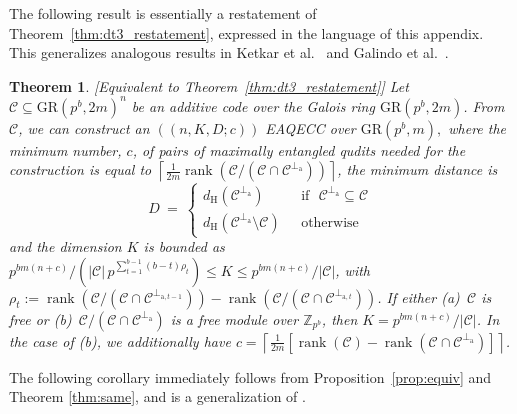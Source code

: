 \documentclass{article}
\DeclareMathOperator{\rank}{rank}
\newtheorem{thm}{Theorem}[section]
\theoremstyle{remark}
\theoremstyle{definition}
\numberwithin{equation}{section}
\begin{document}
The following result is essentially a restatement of Theorem~\ref{thm:dt3_restatement}, expressed in the language of this appendix. This generalizes analogous results in Ketkar et al.\ \cite[Theorem 15]{ketkar} and Galindo et al.\ \cite[Theorem 3]{galindo}.

\begin{thm}\label{thm:dt3_equiv}[Equivalent to Theorem~\ref{thm:dt3_restatement}] Let $\mathcal{C} \subseteq \text{GR}(p^b,2m)^{n}$ be an additive code over the Galois ring $\text{GR}(p^b,2m)$.   From $\mathcal{C}$, we can construct an  $((n,K,D;c))$ EAQECC over $\text{GR}(p^b,m),$ where the minimum number, $c$, of pairs of maximally entangled qudits needed for the construction is equal to  $\left\lceil \frac1{2m}\rank(\mathcal{C}/(\mathcal{C} \cap \mathcal{C}^{\perp_{\mathrm{a}}}))  \right\rceil$, the minimum distance is 
\begin{equation*}
D~=~\left\{\begin{array}{ll}
d_{\mathrm{H}}(\mathcal{C}^{\perp_{\mathrm{a}}}) & \text{~~if~~} \mathcal{C}^{\perp_{\mathrm{a}}} \subseteq \mathcal{C} \\
d_{\mathrm{H}}(\mathcal{C}^{\perp_{\mathrm{a}}}\setminus \mathcal{C} )  & \text{~~otherwise}\,
\end{array}\right.
\end{equation*}
and the dimension $K$ is bounded as $p^{bm(n+c)}/ (|\mathcal{C}| \, {p^{\sum_{t=1}^{b-1} (b-t)\rho_t}}) \leq  K \leq p^{bm(n+c)}/|\mathcal{C}|$, with $\rho_t := \rank(\mathcal{C}/(\mathcal{C} \cap \mathcal{C}^{\perp_{\mathrm{a},t-1}}))-\rank(\mathcal{C}/(\mathcal{C} \cap \mathcal{C}^{\perp_{\mathrm{a},t}}))$.  
If either \emph{(a)}~$\mathcal{C}$ is free or \emph{(b)}~$\mathcal{C}/(\mathcal{C} \cap \mathcal{C}^{\perp_{\mathrm{a}}})$ is a free module over $\mathbb{Z}_{p^b}$, then $K = p^{bm(n+c)}/|\mathcal{C}|$. In the case of \emph{(b)}, we additionally have $c=\left\lceil \frac1{2m}[\rank(\mathcal{C}) - \rank(\mathcal{C} \cap \mathcal{C}^{\perp_{\mathrm{a}}})]\right\rceil$.\end{thm}


The following corollary immediately follows from Proposition~\ref{prop:equiv} and Theorem  \ref{thm:same}, and is a generalization of \cite[Theorem  16]{luo1}.
\end{document}

